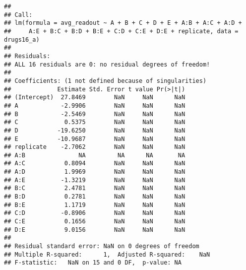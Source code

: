 \documentclass[
]{article}
\begin{document}
\begin{verbatim}
## 
## Call:
## lm(formula = avg_readout ~ A + B + C + D + E + A:B + A:C + A:D + 
##     A:E + B:C + B:D + B:E + C:D + C:E + D:E + replicate, data = drugs16_a)
## 
## Residuals:
## ALL 16 residuals are 0: no residual degrees of freedom!
## 
## Coefficients: (1 not defined because of singularities)
##             Estimate Std. Error t value Pr(>|t|)
## (Intercept)  27.8469        NaN     NaN      NaN
## A            -2.9906        NaN     NaN      NaN
## B            -2.5469        NaN     NaN      NaN
## C             0.5375        NaN     NaN      NaN
## D           -19.6250        NaN     NaN      NaN
## E           -10.9687        NaN     NaN      NaN
## replicate    -2.7062        NaN     NaN      NaN
## A:B               NA         NA      NA       NA
## A:C           0.8094        NaN     NaN      NaN
## A:D           1.9969        NaN     NaN      NaN
## A:E          -1.3219        NaN     NaN      NaN
## B:C           2.4781        NaN     NaN      NaN
## B:D           0.2781        NaN     NaN      NaN
## B:E           1.1719        NaN     NaN      NaN
## C:D          -0.8906        NaN     NaN      NaN
## C:E           0.1656        NaN     NaN      NaN
## D:E           9.0156        NaN     NaN      NaN
## 
## Residual standard error: NaN on 0 degrees of freedom
## Multiple R-squared:      1,  Adjusted R-squared:    NaN 
## F-statistic:   NaN on 15 and 0 DF,  p-value: NA
\end{verbatim}
\end{document}
